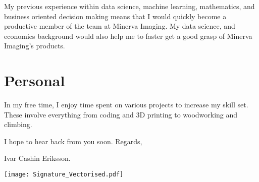 \documentclass[10pt,a4paper,sans]{moderncv.cls}
\newcommand{\company}{Minerva Imaging}
\begin{document}


\hspace{7 mm} My previous experience within data science, machine learning, mathematics, and business oriented decision making means that I would quickly become a productive member of the team at \company{}. My data science, and economics background would also help me to faster get a good grasp of \company{}'s products.

\section{Personal}
In my free time, I enjoy time spent on various projects to increase my skill set. These involve everything from coding and 3D printing to woodworking and climbing.


\vspace{3 mm}
I hope to hear back from you soon. Regards, 

\vspace{3 mm} 
Ivar Cashin Eriksson. 

\vspace{-14mm}
\hfill \texttt{[image: Signature\_Vectorised.pdf]}
\end{document}
